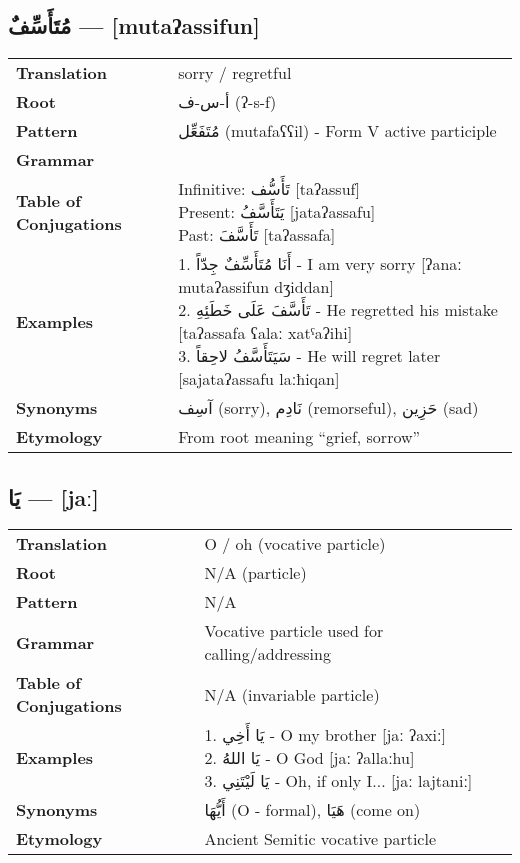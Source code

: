 \documentclass[a4paper,12pt]{article}
\begin{document}
\subsection{\textarabic{مُتَأَسِّفٌ} — [mutaʔassifun]}
\begin{tabular}{p{3cm}p{10cm}}
\toprule
\textbf{Translation} & sorry / regretful \\
\textbf{Root} & \textarabic{أ-س-ف} (ʔ-s-f) \\
\textbf{Pattern} & \textarabic{مُتَفَعِّل} (mutafaʕʕil) - Form V active participle\\
\textbf{Grammar} & \makecell[l]{\parbox{9.5cm}{
	Active participle, masculine singular, nominative (predicate)
}} \\

\textbf{Table of Conjugations} & \makecell[l]{
Infinitive: \textarabic{تَأَسُّف} [taʔassuf] \\
Present: \textarabic{يَتَأَسَّفُ} [jataʔassafu] \\
Past: \textarabic{تَأَسَّفَ} [taʔassafa]
} \\
\midrule
\textbf{Examples} & \makecell[l]{\parbox{9.5cm}{
1. \textarabic{أَنَا مُتَأَسِّفٌ جِدّاً} - I am very sorry [ʔanaː mutaʔassifun dʒiddan]\\
2. \textarabic{تَأَسَّفَ عَلَى خَطَئِهِ} - He regretted his mistake [taʔassafa ʕalaː xatˤaʔihi]\\
3. \textarabic{سَيَتَأَسَّفُ لاحِقاً} - He will regret later [sajataʔassafu laːħiqan]
}} \\
\midrule
\textbf{Synonyms} & \textarabic{آسِف} (sorry), \textarabic{نَادِم} (remorseful), \textarabic{حَزِين} (sad) \\
\textbf{Etymology} & From root meaning ``grief, sorrow'' \\
\bottomrule
\end{tabular}

\subsection{\textarabic{يَا} — [jaː]}
\begin{tabular}{p{3cm}p{10cm}}
\toprule
\textbf{Translation} & O / oh (vocative particle) \\
\textbf{Root} & N/A (particle) \\
\textbf{Pattern} & N/A \\
\textbf{Grammar} & Vocative particle used for calling/addressing \\
\textbf{Table of Conjugations} & N/A (invariable particle) \\
\textbf{Examples} & \makecell[l]{\parbox{9.5cm}{
1. \textarabic{يَا أَخِي} - O my brother [jaː ʔaxiː]\\
2. \textarabic{يَا اللهُ} - O God [jaː ʔallaːhu]\\
3. \textarabic{يَا لَيْتَنِي} - Oh, if only I... [jaː lajtaniː]
}} \\
\midrule
\textbf{Synonyms} & \textarabic{أَيُّهَا} (O - formal), \textarabic{هَيَا} (come on) \\
\textbf{Etymology} & Ancient Semitic vocative particle \\
\bottomrule
\end{tabular}
\end{document}
